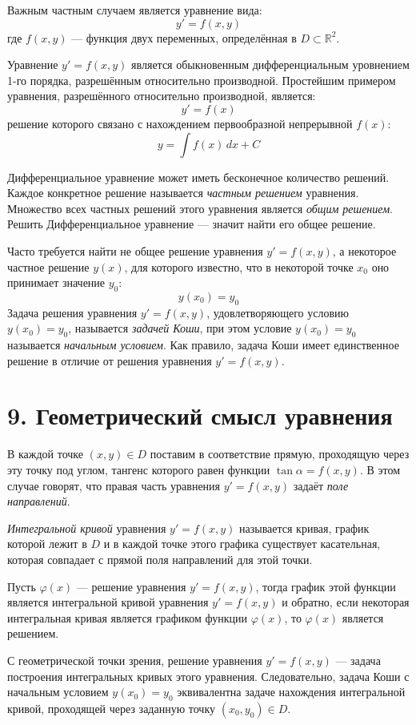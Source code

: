 \documentclass[17pt,a4paper]{extreport}
\begin{document}
Важным частным случаем является уравнение вида:
\[
y' = f(x,y)
\]
где $f(x,y)$ --- функция двух переменных, определённая в $D \subset \mathbb{R}^2$.

Уравнение $y' = f(x,y)$ является обыкновенным дифференциальным уровнением 1-го порядка, разрешённым относительно производной. Простейшим примером уравнения, разрешённого относительно производной, является:
\[
y' = f(x)
\]
решение которого связано с нахождением первообразной непрерывной $f(x)$:
\[
y = \int f(x)\,dx + C
\]

Дифференциальное уравнение может иметь бесконечное количество решений. Каждое конкретное решение называется \emph{частным решением} уравнения. Множество всех частных решений этого уравнения является \emph{общим решением}. Решить Дифференциальное уравнение --- значит найти его общее решение.

Часто требуется найти не общее решение уравнения $y' = f(x,y)$, а некоторое частное решение $y(x)$, для которого известно, что в некоторой точке $x_0$ оно принимает значение $y_0$:
\[
y(x_0) = y_0
\]
Задача решения уравнения $y' = f(x,y)$, удовлетворяющего условию $y(x_0) = y_0$, называется \emph{задачей Коши}, при этом условие $y(x_0) = y_0$ называется \emph{начальным условием}. Как правило, задача Коши имеет единственное решение в отличие от решения уравнения $y' = f(x,y)$.

\newpage

\section{9. Геометрический смысл уравнения}

В каждой точке $(x,y) \in D$ поставим в соответствие прямую, проходящую через эту точку под углом, тангенс которого равен функции $\tan\alpha = f(x,y)$. В этом случае говорят, что правая часть уравнения $y' = f(x,y)$ задаёт \emph{поле направлений}. 

\emph{Интегральной кривой} уравнения $y' = f(x,y)$ называется кривая, график которой лежит в $D$ и в каждой точке этого графика существует касательная, которая совпадает с прямой поля направлений для этой точки.

Пусть $\varphi(x)$ --- решение уравнения $y' = f(x,y)$, тогда график этой функции является интегральной кривой уравнения $y' = f(x,y)$ и обратно, если некоторая интегральная кривая является графиком функции $\varphi(x)$, то $\varphi(x)$ является решением.

С геометрической точки зрения, решение уравнения $y' = f(x,y)$ --- задача построения интегральных кривых этого уравнения. Следовательно, задача Коши с начальным условием $y(x_0) = y_0$ эквивалентна задаче нахождения интегральной кривой, проходящей через заданную точку $(x_0, y_0) \in D$.
\end{document}
